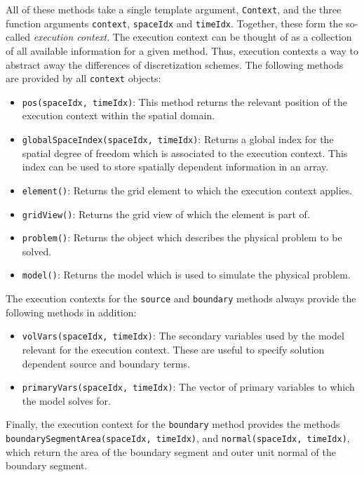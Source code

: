 All of these methods take a single template argument,
\texttt{Context}, and the three function arguments \texttt{context},
\texttt{spaceIdx} and \texttt{timeIdx}. Together, these form the
so-called \textit{execution context}. The execution context can be
thought of as a collection of all available information for a given
method. Thus, execution contexts a way to abstract away the
differences of discretization schemes. The following methods are
provided by all \texttt{context} objects:
\begin{itemize}
\item \texttt{pos(spaceIdx, timeIdx)}: This method returns the
  relevant position of the execution context within the spatial
  domain.
\item \texttt{globalSpaceIndex(spaceIdx, timeIdx)}: Returns a global
  index for the spatial degree of freedom which is associated to the
  execution context. This index can be used to store spatially
  dependent information in an array.
\item \texttt{element()}: Returns the \Dune grid element to which the
  execution context applies.
\item \texttt{gridView()}: Returns the \Dune grid view of which the
  element is part of.
\item \texttt{problem()}: Returns the \eWoms object which describes
  the physical problem to be solved.
\item \texttt{model()}: Returns the \eWoms model which is used to simulate
  the physical problem.
\end{itemize}

The execution contexts for the \texttt{source} and \texttt{boundary}
methods always provide the following methods in addition:
\begin{itemize}
\item \texttt{volVars(spaceIdx, timeIdx)}: The secondary variables
  used by the model relevant for the execution context. These are
  useful to specify solution dependent source and boundary terms.
\item \texttt{primaryVars(spaceIdx, timeIdx)}: The vector of primary
  variables to which the model solves for.
\end{itemize}

Finally, the execution context for the \texttt{boundary} method
provides the methods \texttt{boundarySegmentArea(spaceIdx, timeIdx)},
and \texttt{normal(spaceIdx, timeIdx)}, which return the area of the
boundary segment and outer unit normal of the boundary segment.

